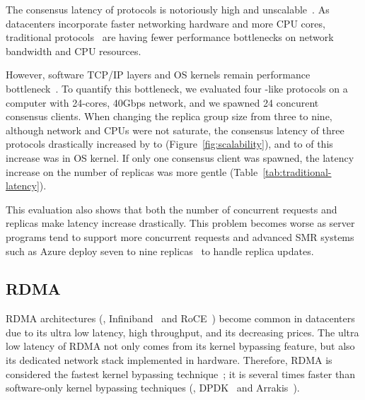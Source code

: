 The consensus latency of \paxos protocols is notoriously high and 
unscalable~\cite{zookeeper,scatter:sosp11}. As datacenters incorporate 
faster networking hardware and more CPU cores, traditional \paxos 
protocols~\cite{libpaxos,spaxos:srds12,crane:sosp15,rex:eurosys14,zookeeper} are 
having fewer performance bottlenecks on network bandwidth and CPU resources. 


However, software TCP/IP layers and OS kernels remain performance 
bottleneck~\cite{arrakis:osdi14}. To quantify this bottleneck, we evaluated 
four \paxos-like protocols on a computer with 24-cores, 40Gbps network, and we 
spawned 24 concurent consensus clients. When changing the replica group size 
from three to nine, although network and CPUs were not saturate, the consensus 
latency of three protocols drastically increased by \tradlatencyincreaselow to 
\tradlatencyincreasehigh (Figure~\ref{fig:scalability}), and \systemcostlow to 
\systemcosthigh of this increase was in OS kernel. If only one consensus client 
was spawned, the latency increase on the number of replicas was more gentle 
(Table~\ref{tab:traditional-latency}).

This evaluation also shows that both the number of concurrent requests and 
replicas make \paxos latency increase drastically. This problem becomes worse 
as server programs tend to support more concurrent requests and advanced SMR 
systems such as Azure deploy seven to nine replicas~\cite{azure:book} to handle 
replica updates.




\subsection{RDMA}\label{sec:rdma}
RDMA architectures (\eg, Infiniband~\cite{infiniband} and RoCE~\cite{roce})
become common in datacenters due to its ultra low latency, high throughput, and 
its decreasing prices. The ultra low latency of RDMA not only comes from its 
kernel bypassing feature, but also its dedicated network stack implemented in 
hardware. Therefore, RDMA is considered the fastest kernel bypassing 
technique~\cite{herd:sigcomm14,pilaf:usenix14,dare:hpdc15}; it is several times 
faster than software-only kernel bypassing techniques (\eg, DPDK~\cite{dpdk} 
and Arrakis~\cite{arrakis:osdi14}).

